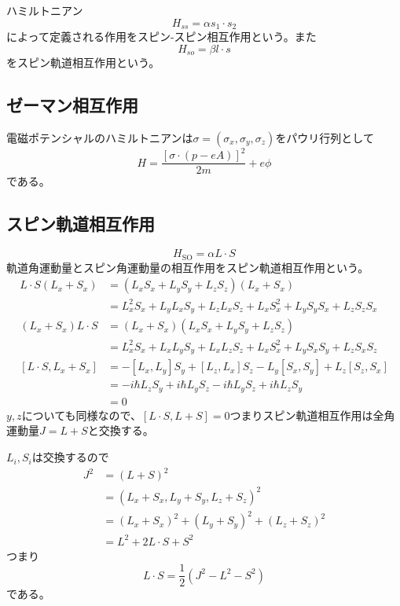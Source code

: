     ハミルトニアン
        \[H_{ss} = \alpha s_1 \cdot s_2\]
    によって定義される作用をスピン-スピン相互作用という。また
        \[H_{so} = \beta l \cdot s\]
    をスピン軌道相互作用という。

\subsection{ゼーマン相互作用}
    電磁ポテンシャルのハミルトニアンは$\sigma = (\sigma_x, \sigma_y, \sigma_z)$をパウリ行列として
        \[H = \frac{[\sigma \cdot (p - eA)]^2}{2m} + e\phi\]
    である。

\subsection{スピン軌道相互作用}
        \[H_{\text{SO}} = \alpha L \cdot S\]
    軌道角運動量とスピン角運動量の相互作用をスピン軌道相互作用という。
    \begin{align*}
        L \cdot S(L_x + S_x)
            &= (L_xS_x + L_yS_y + L_zS_z)(L_x + S_x)\\
            &= L_x^2S_x + L_yL_xS_y + L_zL_xS_z + L_xS_x^2 + L_yS_yS_x + L_zS_zS_x\\
        (L_x + S_x)L \cdot S
            &= (L_x + S_x)(L_xS_x + L_yS_y + L_zS_z)\\
            &= L_x^2S_x + L_xL_yS_y + L_xL_zS_z + L_xS_x^2 + L_yS_xS_y + L_zS_xS_z\\
        [L \cdot S, L_x + S_x]
            &= -[L_x, L_y]S_y + [L_z, L_x]S_z - L_y[S_x, S_y] + L_z[S_z, S_x]\\
            &= -i\hbar L_zS_y + i\hbar L_yS_z - i\hbar L_yS_z + i\hbar L_zS_y\\
            &= 0
    \end{align*}
    $y, z$についても同様なので、$[L \cdot S, L + S] = 0$つまりスピン軌道相互作用は全角運動量$J = L + S$と交換する。
    
    $L_i, S_i$は交換するので
    \begin{align*}
        J^2 &= (L + S)^2\\
            &= (L_x + S_x, L_y + S_y, L_z + S_z)^2\\
            &= (L_x + S_x)^2 + (L_y + S_y)^2 + (L_z + S_z)^2\\
            &= L^2 + 2 L \cdot S + S^2
    \end{align*}
    つまり
        \[L \cdot S = \frac{1}{2}(J^2 - L^2 - S^2)\]
    である。

